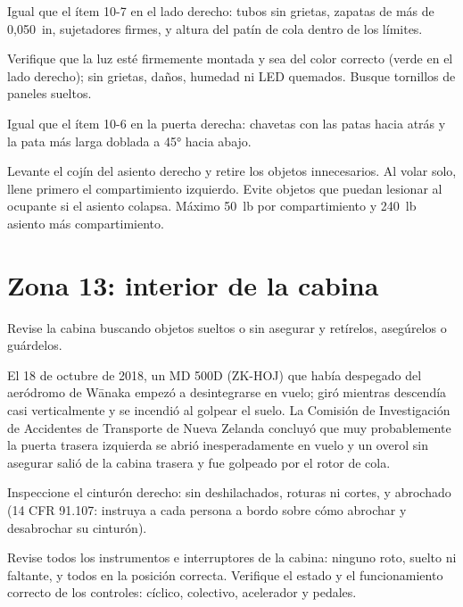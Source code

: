Igual que el ítem 10-7 en el lado derecho: tubos sin grietas, zapatas de más de 0,050~in, sujetadores firmes, y altura del patín de cola dentro de los límites.

Verifique que la luz esté firmemente montada y sea del color correcto (verde en el lado derecho); sin grietas, daños, humedad ni LED quemados. Busque tornillos de paneles sueltos.

Igual que el ítem 10-6 en la puerta derecha: chavetas con las patas hacia atrás y la pata más larga doblada a 45° hacia abajo.

Levante el cojín del asiento derecho y retire los objetos innecesarios. Al volar solo, llene primero el compartimiento izquierdo. Evite objetos que puedan lesionar al ocupante si el asiento colapsa. Máximo 50~lb por compartimiento y 240~lb asiento más compartimiento.

\section{Zona 13: interior de la cabina}

Revise la cabina buscando objetos sueltos o sin asegurar y retírelos, asegúrelos o guárdelos.

\begin{caso}
El 18 de octubre de 2018, un MD 500D (ZK-HOJ) que había despegado del aeródromo de Wānaka empezó a desintegrarse en vuelo; giró mientras descendía casi verticalmente y se incendió al golpear el suelo. La Comisión de Investigación de Accidentes de Transporte de Nueva Zelanda concluyó que muy probablemente la puerta trasera izquierda se abrió inesperadamente en vuelo y un overol sin asegurar salió de la cabina trasera y fue golpeado por el rotor de cola.
\end{caso}

Inspeccione el cinturón derecho: sin deshilachados, roturas ni cortes, y abrochado (14 CFR 91.107: instruya a cada persona a bordo sobre cómo abrochar y desabrochar su cinturón).

Revise todos los instrumentos e interruptores de la cabina: ninguno roto, suelto ni faltante, y todos en la posición correcta. Verifique el estado y el funcionamiento correcto de los controles: cíclico, colectivo, acelerador y pedales.


